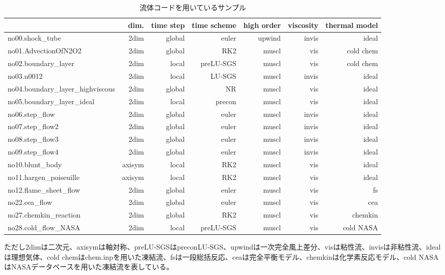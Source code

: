 \documentclass{jsarticle}
\begin{document}
\begin{table}[b]%
\centering
\caption{流体コードを用いているサンプル}
\begin{tabular}{lrrrrrr}
 & dim. & time step & time scheme & high order & viscosity & thermal model\\
\hline
no00.shock\_tube                  & 2dim   & global & euler     & upwind & invis & ideal \\
no01.AdvectionOfN2O2              & 2dim   & global & RK2       & muscl  & vis   & cold chem \\
no02.boundary\_layer              & 2dim   & local  & preLU-SGS & muscl  & vis   & cold chem \\
no03.n0012                        & 2dim   & local  & LU-SGS    & muscl  & invis & ideal \\
no04.boundary\_layer\_highviscous & 2dim   & global & NR        & muscl  & vis   & ideal \\
no05.boundary\_layer\_ideal       & 2dim   & local  & precon    & muscl  & vis   & ideal \\
no06.step\_flow                   & 2dim   & global & euler     & muscl  & invis & ideal \\
no07.step\_flow2                  & 2dim   & global & euler     & muscl  & invis & ideal \\
no08.step\_flow3                  & 2dim   & global & euler     & muscl  & invis & ideal \\
no09.step\_flow4                  & 2dim   & global & euler     & muscl  & invis & ideal \\
no10.blunt\_body                  & axisym & local  & RK2       & muscl  & vis   & ideal \\
no11.hargen\_poiseuille           & axisym & local  & RK2       & muscl  & vis   & ideal \\
no12.flame\_sheet\_flow           & 2dim   & global & euler     & muscl  & vis   & fs \\
no22.cea\_flow                    & 2dim   & global & euler     & muscl  & vis   & cea \\
no27.chemkin\_reaction            & 2dim   & global & RK2       & muscl  & vis   & chemkin \\
no28.cold\_flow\_NASA             & 2dim   & local  & preLU-SGS & muscl  & vis   & cold NASA \\
\hline
\end{tabular}
\flushleft
ただし2dimは二次元、axisymは軸対称、preLU-SGSはpreconLU-SGS、upwindは一次完全風上差分、visは粘性流、invisは非粘性流、idealは理想気体、cold chemはchem.inpを用いた凍結流、fsは一段総括反応、ceaは完全平衡モデル、chemkinは化学素反応モデル、cold NASAはNASAデータベースを用いた凍結流を表している。
\end{table}
\end{document}
